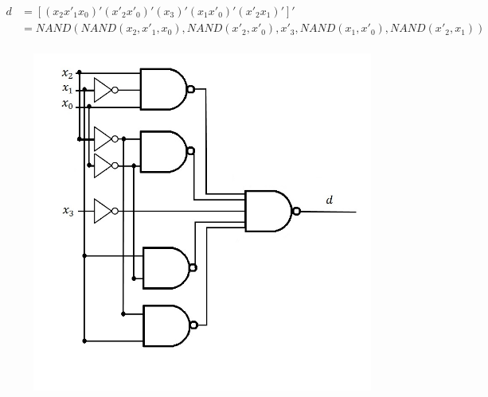 \documentclass{article}
\begin{document}
\begin{equation*}
\begin{split}
d & = [ (x_2 x'_1 x_0)' (x'_2 x'_0)' (x_3)' (x_1 x'_0)' (x'_2 x_1)' ]' \\ 
  & = NAND(NAND(x_2, x'_1, x_0), NAND(x'_2, x'_0), x'_3, NAND(x_1, x'_0), 
      NAND(x'_2, x_1)) \\
\end{split}
\end{equation*}
\begin{figure}[h!]
\centering
\includegraphics[scale=0.25]{d-NAND-NAND}
\end{figure}

\clearpage
\end{document}
